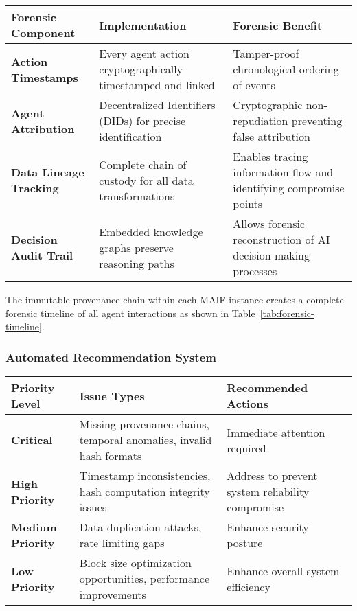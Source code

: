 \documentclass[conference]{IEEEtran}
\begin{document}
\begin{table*}[!t]
\renewcommand{\arraystretch}{1.3}
\caption{MAIF Forensic Timeline Reconstruction Capabilities}
\label{tab:forensic-timeline}
\centering
\footnotesize
\begin{tabular}{p{3cm}p{6cm}p{5cm}}
\toprule
\textbf{Forensic Component} & \textbf{Implementation} & \textbf{Forensic Benefit} \\
\midrule
\textbf{Action Timestamps} & Every agent action cryptographically timestamped and linked & Tamper-proof chronological ordering of events \\
\textbf{Agent Attribution} & Decentralized Identifiers (DIDs) for precise identification & Cryptographic non-repudiation preventing false attribution \\
\textbf{Data Lineage Tracking} & Complete chain of custody for all data transformations & Enables tracing information flow and identifying compromise points \\
\textbf{Decision Audit Trail} & Embedded knowledge graphs preserve reasoning paths & Allows forensic reconstruction of AI decision-making processes \\
\bottomrule
\end{tabular}
\end{table*}

The immutable provenance chain within each MAIF instance creates a complete forensic timeline of all agent interactions as shown in Table~\ref{tab:forensic-timeline}.

\subsubsection{Automated Recommendation System}

\begin{table*}[!t]
\renewcommand{\arraystretch}{1.3}
\caption{MAIF Forensic Recommendation Priority Levels}
\label{tab:forensic-recommendations}
\centering
\footnotesize
\begin{tabular}{p{2.5cm}p{6.5cm}p{5cm}}
\toprule
\textbf{Priority Level} & \textbf{Issue Types} & \textbf{Recommended Actions} \\
\midrule
\textbf{Critical} & Missing provenance chains, temporal anomalies, invalid hash formats & Immediate attention required \\
\textbf{High Priority} & Timestamp inconsistencies, hash computation integrity issues & Address to prevent system reliability compromise \\
\textbf{Medium Priority} & Data duplication attacks, rate limiting gaps & Enhance security posture \\
\textbf{Low Priority} & Block size optimization opportunities, performance improvements & Enhance overall system efficiency \\
\bottomrule
\end{tabular}
\end{table*}
\end{document}
